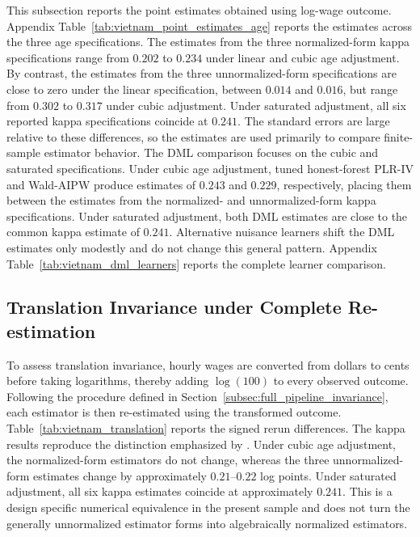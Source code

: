 \documentclass[12pt, a4paper, oneside]{article}
\theoremstyle{plain}
\theoremstyle{definition}
\begin{document}
This subsection reports the point estimates obtained using log-wage outcome. Appendix Table~\ref{tab:vietnam_point_estimates_age} reports the estimates across the three age specifications. The estimates from the three normalized-form kappa specifications range from \(0.202\) to \(0.234\) under linear and cubic age adjustment. By contrast, the estimates from the three unnormalized-form specifications are close to zero under the linear specification, between \(0.014\) and \(0.016\), but range from \(0.302\) to \(0.317\) under cubic adjustment. Under saturated adjustment, all six reported kappa specifications coincide at \(0.241\). The standard errors are large relative to these differences, so the estimates are used primarily to compare finite-sample estimator behavior.
The DML comparison focuses on the cubic and saturated specifications. Under cubic age adjustment, tuned honest-forest PLR-IV and Wald-AIPW produce estimates of \(0.243\) and \(0.229\), respectively, placing them between the estimates from the normalized- and unnormalized-form kappa specifications. Under saturated adjustment, both DML estimates are close to the common kappa estimate of \(0.241\). Alternative nuisance learners shift the DML estimates only modestly and do not change this general pattern. Appendix Table~\ref{tab:vietnam_dml_learners} reports the complete learner comparison.


\subsection{Translation Invariance under Complete Re-estimation}
\label{subsec:vietnam_translation}

To assess translation invariance, hourly wages are converted from dollars to
cents before taking logarithms, thereby adding \(\log(100)\) to every observed
outcome. Following the procedure defined in
Section~\ref{subsec:full_pipeline_invariance}, each estimator is then
re-estimated using the transformed outcome. Table~\ref{tab:vietnam_translation}
reports the signed rerun differences.
The kappa results reproduce the distinction emphasized by \citet{sloczynski2025abadie}. Under cubic age adjustment, the normalized-form estimators do not change, whereas the three unnormalized-form estimates change by approximately \(0.21\)–\(0.22\) log points. Under saturated adjustment, all six kappa estimates coincide at approximately \(0.241\).
This is a design specific numerical equivalence in the present sample and does not turn the generally unnormalized estimator forms into algebraically normalized estimators.
\end{document}
